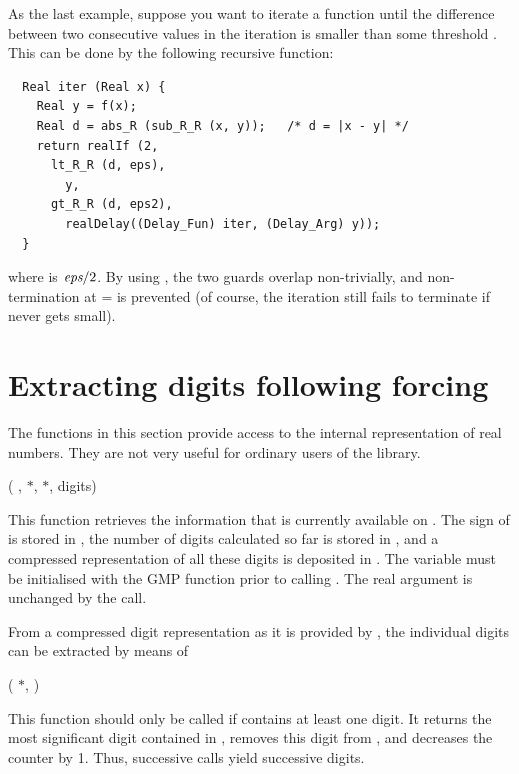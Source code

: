 \documentclass[a4paper,12pt]{article}
\newenvironment{funlist}{\begin{list}%
   {}%
   {\topsep=0pt%
        \leftmargin=0cm%
        \rightmargin=0cm%
        \listparindent=0cm%
        \parskip=10pt%
        \partopsep=0pt%
        \itemsep=0pt%
        \parsep=0pt}}%
   {\end{list}}
\begin{document}
As the last example,
suppose you want to iterate a function 
until the difference between two consecutive values in the iteration
is smaller than some threshold .
This can be done by the following recursive function:
\begin{verbatim}
  Real iter (Real x) {
    Real y = f(x);
    Real d = abs_R (sub_R_R (x, y));   /* d = |x - y| */
    return realIf (2,
      lt_R_R (d, eps),
        y,
      gt_R_R (d, eps2),
        realDelay((Delay_Fun) iter, (Delay_Arg) y));
  }
\end{verbatim}
where  is $\textit{eps}/2$.
By using , the two guards overlap non-trivially,
and non-termination at  =  is prevented
(of course, the iteration still fails to terminate
 if  never gets small).

\section{Extracting digits following forcing}

The functions in this section provide access to the internal representation
of real numbers.
They are not very useful for ordinary users of the library.

\begin{funlist}
\item {} (%
 ,  $\ast$,  $\ast$,
    digits)
\end{funlist}
This function retrieves the information that is currently available on .
The sign of  is stored in ,
the number of digits calculated so far is stored in ,
and a compressed representation of all these digits is deposited in .
The variable  must be initialised 
with the GMP function  prior to calling .
The real argument  is unchanged by the call.

From a compressed digit representation as it is provided by ,
the individual digits can be extracted by means of
\begin{funlist}
\item {} ( $\ast$,
    )
\end{funlist}
This function should only be called if 
contains at least one digit.
It returns the most significant digit contained in ,
removes this digit from ,
and decreases the counter  by 1.
Thus, successive calls yield successive digits.
\end{document}
